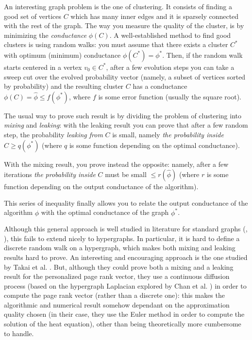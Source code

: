 \documentclass[../main.tex]{subfiles}
\begin{document}
    An interesting graph problem is the one of clustering. It consists of finding a good set of vertices $C$ which has many inner edges and it is sparsely connected with the rest of the graph. The way you measure the quality of the cluster, is by minimizing the \textit{conductance} $\phi(C)$. A well-established method to find good clusters is using random walks: you must assume that there exists a cluster $C^*$ with optimum (minimum) conductance $\phi(C^*) = \phi^*$. Then, if the random walk starts centered in a vertex $v_0\in C^*$, after a few evolution steps you can take a sweep cut over the evolved probability vector (namely, a subset of vertices sorted by probability) and the resulting cluster $C$ has a conductance $\phi(C) = \hat{\phi} \leq f(\phi^*)$, where $f$ is some error function (usually the square root).
    
    The usual way to prove such result is by dividing the problem of clustering into \textit{mixing} and \textit{leaking}: with the leaking result you can prove that after a few random step, the probability \textit{leaking from} $C$ is small, namely \textit{the probability inside }$C \geq q(\phi^*)$ (where $q$ is some function depending on the optimal conductance). 
    
    With the mixing result, you prove instead the opposite: namely, after a few iterations \textit{the probability inside} $C$ must be small $\leq r(\hat{\phi})$ (where $r$ is some function depending on the output conductance of the algorithm).
    
    This series of inequality finally allows you to relate the output conductance of the algorithm $\hat{\phi}$ with the optimal conductance of the graph $\phi^*$.
    
    Although this general approach is well studied in literature for standard graphs (\cite{SpielmanClustering}, \cite{AndersenPPRClustering}), this fails to extend nicely to hypergraphs. In particular, it is hard to define a discrete random walk on a hypergraph, which makes both mixing and leaking results hard to prove. An interesting and encouraging approach is the one studied by Takai et al. \cite{Takai_2020}. But, although they could prove both a mixing and a leaking result for the personalized page rank vector, they use a continuous diffusion process (based on the hypergraph Laplacian explored by Chan et al. \cite{continuous_laplacian_hypergraph}) in order to compute the page rank vector (rather than a discrete one): this makes the algorithmic and numerical result somehow dependant on the approximation quality chosen (in their case, they use the Euler method in order to compute the solution of the heat equation), other than being theoretically more cumbersome to handle.
    
\end{document}
